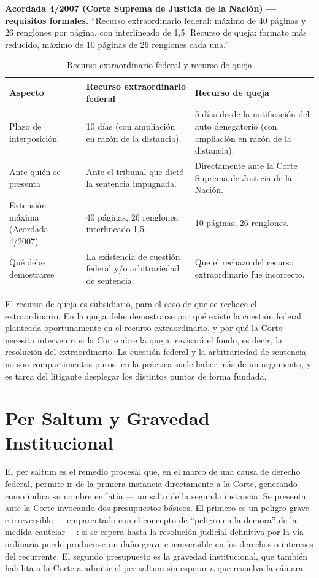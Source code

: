 \documentclass[12pt,oneside]{book}
\begin{document}
\begin{important}
\textbf{Acordada 4/2007 (Corte Suprema de Justicia de la Nación) --- requisitos formales.} ``Recurso extraordinario federal: máximo de 40 páginas y 26 renglones por página, con interlineado de 1,5. Recurso de queja: formato más reducido, máximo de 10 páginas de 26 renglones cada una.''
\end{important}

\begin{table}[H]
\centering
\caption{Recurso extraordinario federal y recurso de queja}
\begin{tabularx}{\textwidth}{>{\raggedright\arraybackslash}p{} X X}
\toprule
\textbf{Aspecto} & \textbf{Recurso extraordinario federal} & \textbf{Recurso de queja} \\
\midrule
Plazo de interposición & 10 días (con ampliación en razón de la distancia). & 5 días desde la notificación del auto denegatorio (con ampliación en razón de la distancia). \\
Ante quién se presenta & Ante el tribunal que dictó la sentencia impugnada. & Directamente ante la Corte Suprema de Justicia de la Nación. \\
Extensión máxima (Acordada 4/2007) & 40 páginas, 26 renglones, interlineado 1,5. & 10 páginas, 26 renglones. \\
Qué debe demostrarse & La existencia de cuestión federal y/o arbitrariedad de sentencia. & Que el rechazo del recurso extraordinario fue incorrecto. \\
\bottomrule
\end{tabularx}
\end{table}

El recurso de queja es subsidiario, para el caso de que se rechace el extraordinario. En la queja debe demostrarse por qué existe la cuestión federal planteada oportunamente en el recurso extraordinario, y por qué la Corte necesita intervenir; si la Corte abre la queja, revisará el fondo, es decir, la resolución del extraordinario. La cuestión federal y la arbitrariedad de sentencia no son compartimentos puros: en la práctica suele haber más de un argumento, y es tarea del litigante desplegar los distintos puntos de forma fundada.

\section{Per Saltum y Gravedad Institucional}

El per saltum es el remedio procesal que, en el marco de una causa de derecho federal, permite ir de la primera instancia directamente a la Corte, generando --- como indica su nombre en latín --- un salto de la segunda instancia. Se presenta ante la Corte invocando dos presupuestos básicos. El primero es un peligro grave e irreversible --- emparentado con el concepto de ``peligro en la demora'' de la medida cautelar ---: si se espera hasta la resolución judicial definitiva por la vía ordinaria puede producirse un daño grave e irreversible en los derechos o intereses del recurrente. El segundo presupuesto es la gravedad institucional, que también habilita a la Corte a admitir el per saltum sin esperar a que resuelva la cámara.
\end{document}
